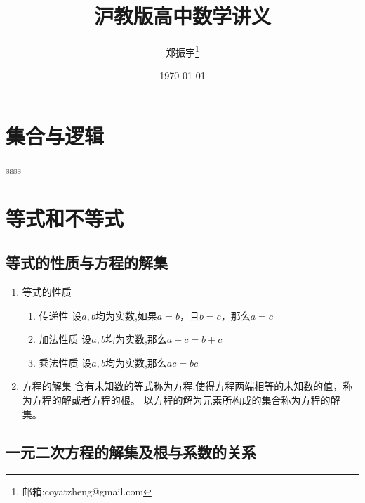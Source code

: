 \documentclass[11pt,a4paper]{ctexbook}
\title{沪教版高中数学讲义}
\author{ 郑振宇\thanks{邮箱:coyatzheng@gmail.com}}
\date{\today}
\begin{document}
\newtheorem{problem}{例}[section]
\newtheorem{hmwk}{}
\setlength{\parindent}{0em}


\maketitle



\chapter{集合与逻辑}
ssss
\chapter{等式和不等式}

\section{等式的性质与方程的解集}
\begin{enumerate}
    \item 等式的性质
    \begin{enumerate}
        \item 传递性  设$a,b$均为实数,如果$a=b$，且$b=c$，那么$a=c$ 
        \item 加法性质  设$a,b$均为实数,那么$a+c=b+c$ 
        \item 乘法性质  设$a,b$均为实数,那么$ac=bc$ 
    \end{enumerate}
    \item 方程的解集 \quad  含有未知数的等式称为方程.使得方程两端相等的未知数的值，称为方程的解或者方程的根。
    以方程的解为元素所构成的集合称为方程的解集。
\end{enumerate}

\section{一元二次方程的解集及根与系数的关系}
\end{document}
